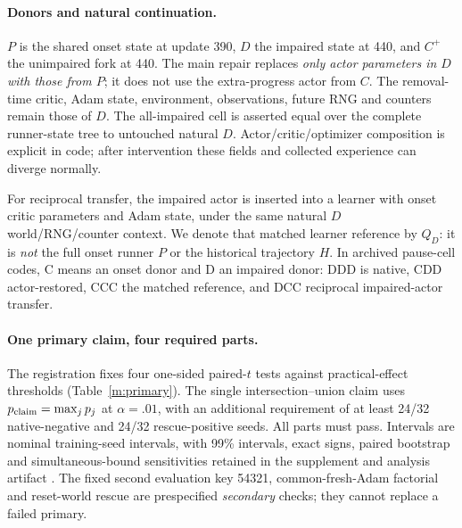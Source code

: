 \documentclass[10pt]{article}
\begin{document}
\paragraph{Donors and natural continuation.}
$P$ is the shared onset state at update 390, $D$ the impaired state at 440, and $C^+$ the unimpaired fork at 440. The main repair replaces \emph{only actor parameters in $D$ with those from $P$}; it does not use the extra-progress actor from $C$. The removal-time critic, Adam state, environment, observations, future RNG and counters remain those of $D$. The all-impaired cell is asserted equal over the complete runner-state tree to untouched natural $D$. Actor/critic/optimizer composition is explicit in code; after intervention these fields and collected experience can diverge normally.

For reciprocal transfer, the impaired actor is inserted into a learner with onset critic parameters and Adam state, under the same natural $D$ world/RNG/counter context. We denote that matched learner reference by $Q_D$: it is \emph{not} the full onset runner $P$ or the historical trajectory $H$. In archived pause-cell codes, C means an onset donor and D an impaired donor: DDD is native, CDD actor-restored, CCC the matched reference, and DCC reciprocal impaired-actor transfer.

\paragraph{One primary claim, four required parts.}
The registration fixes four one-sided paired-$t$ tests against practical-effect thresholds (Table~\ref{m:primary}). The single intersection--union claim uses $p_{\rm claim}=\max_jp_j$ at $\alpha=.01$, with an additional requirement of at least 24/32 native-negative and 24/32 rescue-positive seeds. All parts must pass. Intervals are nominal training-seed intervals, with 99\% intervals, exact signs, paired bootstrap and simultaneous-bound sensitivities retained in the supplement and analysis artifact \citep{henderson2018matters,agarwal2021precipice}. The fixed second evaluation key 54321, common-fresh-Adam factorial and reset-world rescue are prespecified \emph{secondary} checks; they cannot replace a failed primary.
\end{document}
